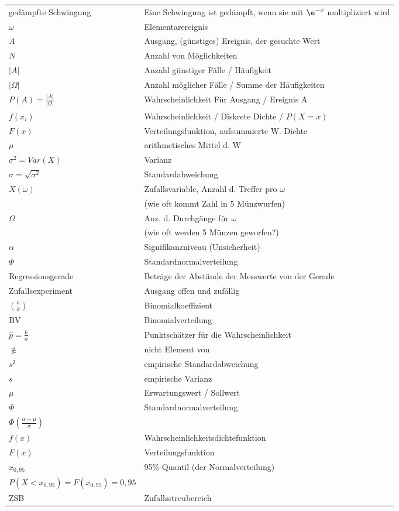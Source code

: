 \begin{table}[h]
\begin{tabular}{ll}
	gedämpfte Schwingung & Eine Schwingung ist gedämpft, wenn sie mit $\e^{-x}$ multipliziert wird\\
	$\omega$ & Elementarereignis\\
	$A$  & Ausgang, (günstiges) Ereignis, der gesuchte Wert\\
	$N$  & Anzahl von Möglichkeiten\\
	$|A|$& Anzahl günstiger Fälle / Häufigkeit\\
	$|\Omega|$ & Anzahl möglicher Fälle / Summe der Häufigkeiten\\
	$P(A)=\frac{|A|}{|\Omega|}$ & Wahrscheinlichkeit Für Ausgang / Ereignis A\\
	$f(x_i)$ & Wahrscheinlichkeit / Diskrete Dichte / $P(X=x)$\\
	$F(x)$ & Verteilungsfunktion, aufsummierte W.-Dichte\\
	$\mu$ & arithmetisches Mittel d. W\\
	$\sigma^2=Var(X)$ & Varianz\\
	$\sigma=\sqrt{\sigma^2}$ & Standardabweichung\\
	$X(\omega)$ & Zufallsvariable, Anzahl d. Treffer pro $\omega$\\
	& (wie oft kommt Zahl in 5 Münzwurfen)\\
	$\Omega$ & Anz. d. Durchgänge für $\omega$\\
	& (wie oft werden 5 Münzen geworfen?) \\
	$\alpha$ & Signifikanzniveau (Unsicherheit)\\
	$\Phi$ & Standardnormalverteilung\\
	Regressionsgerade & Beträge der Abstände der Messwerte von der Gerade\\
	Zufallsexperiment & Ausgang offen und zufällig\\
	$\binom{n}{k}$ & Binomialkoeffizient\\
	BV & Binomialverteilung\\
	$\hat{p}=\frac{k}{n}$ & Punktschätzer für die Wahrscheinlichkeit\\
	$\notin$ & nicht Element von \\ 	
	$s^2$ & empirische Standardabweichung\\
	$s$ & empirische Varianz\\
	$\mu$ & Erwartungswert / Sollwert\\
	$\Phi$ & Standardnormalverteilung\\
	$\Phi\left( \frac{\alpha-\mu}{\sigma} \right)$ &  \\
	$f(x)$  & Wahrscheinlichkeitsdichtefunktion\\
	$F(x)$ & Verteilungsfunktion\\
	$x_{0,95}$ & 95\%-Quantil (der Normalverteilung)\\
	$P(X < x_{0,95}) = F(x_{0,95}) = 0,95$ &\\
	ZSB & Zufallsstreubereich\\
\end{tabular}
\end{table}
